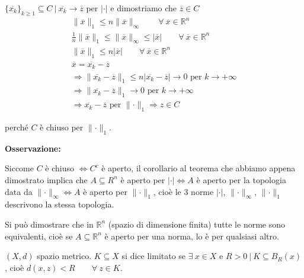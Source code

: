 \begin{exbar}
\begin{example}
\begin{itemize}
		$\{ \overline{x_k}\}_{k \geq 1} \subseteq C \ \big| \ \overline{x_k} \rightarrow \overline{z}$ per $|\cdot|$ e dimostriamo che $\overline{z} \in C$ 
		\begin{gather*}
			\parallel \overline{x} \parallel_1 \leq n \parallel \overline{x} \parallel_\infty \qquad \forall \ \overline{x} \in \mathbb{R}^n
			\\
			\frac{1}{n} \parallel \overline{x} \parallel_1 \leq \parallel \overline{x}\parallel_\infty \leq |\overline{x}| \qquad \forall \ \overline{x} \in \mathbb{R}^n
			\\
			\parallel \overline{x} \parallel_1 \leq n |\overline{x}| \qquad \forall \ \overline{x} \in \mathbb{R}^n
			\\
			\overline{x} = \overline{x_k} - \overline{z}
			\\
			\Rightarrow \parallel \overline{x_k} - \overline{z} \parallel_1 \leq n |\overline{x_k} - \overline{z}| \rightarrow 0 \text{ per } k \rightarrow +\infty
			\\
			\Rightarrow \parallel \overline{x_k} - \overline{z} \parallel_1 \rightarrow 0 \text{ per } k \rightarrow +\infty
			\\
			\Rightarrow \overline{x_k} - \overline{z} \text{ per } \parallel \cdot \parallel_1 \Rightarrow z \in C
		\end{gather*}
		
		perché $C$ è chiuso per $\parallel \cdot \parallel_1$.
	\end{itemize}
\end{example}
\end{exbar}


\textbf{Osservazione:}

Siccome $C$ è chiuso $\iff C^c$ è aperto, il corollario al teorema che abbiamo appena dimostrato implica che $A \subseteq R^n$ è aperto per $|\cdot|  \iff A $ è aperto per la topologia data da $\parallel \cdot \parallel_\infty \iff A$ è aperto per $\parallel \cdot \parallel_1$, cioè le 3 norme $|\cdot|$, $\parallel \cdot \parallel_\infty$, $\parallel \cdot \parallel_1$ descrivono la stessa topologia.

\begin{attbar}
	Si può dimostrare che in $\mathbb{R}^n$ (spazio di dimensione finita) tutte le norme sono equivalenti, cioè se $A \subseteq \mathbb{R}^n$ è aperto per una norma, lo è per qualsiasi altro.
\end{attbar}


\begin{definition}
	$(X,d)$ spazio metrico. $K \subseteq X$ si dice limitato se $\exists \ x \in X$ e $R>0 \ \big| \ K \subseteq B_R(x)$, cioè $d(x,z) < R \qquad \forall \ z \in K$. 
\end{definition}


